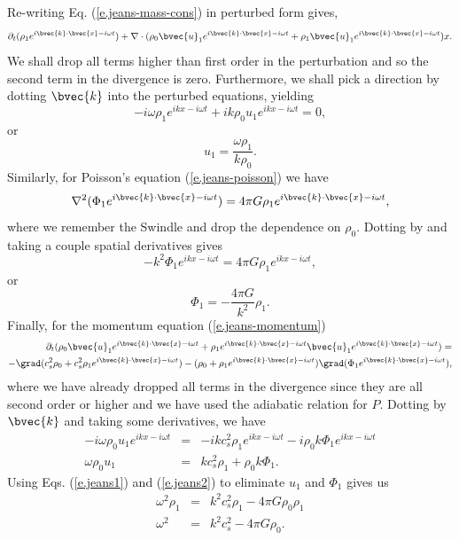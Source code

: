 Re-writing Eq. (\ref{e.jeans-mass-cons}) in perturbed form gives,
\newcommand{\expikx}{\ensuremath{e^{i\bvec{k}\cdot\bvec{x}-i\omega t}}}
\newcommand{\expikxb}{\ensuremath{e^{i{k}{x}-i\omega t}}}
\[ \partial_t (\rho_1 \expikx) + \nabla\cdot(\rho_0\bvec{u}_1\expikx + \rho_1\bvec{u}_1 \expikx)x.  \]
We shall drop all terms higher than first order in the perturbation and so the second term in the divergence is zero.
Furthermore, we shall pick a direction by dotting $\bvec{k}$ into the perturbed equations, yielding
\[
  -i\omega \rho_1 \expikxb + i k \rho_0 u_1 \expikxb = 0,
\]
or
\begin{equation}
  u_1 = \frac{\omega \rho_1}{k \rho_0}. \label{e.jeans1}
\end{equation}
Similarly, for Poisson's equation (\ref{e.jeans-poisson}) we have
\[ \nabla^2 (\Phi_1 \expikx) = 4\pi G \rho_1\expikx, \]
where we remember the Swindle and drop the dependence on $\rho_0$.
Dotting by  and taking a couple spatial derivatives gives
\[ -k^2 \Phi_1 \expikxb = 4\pi G \rho_1 \expikxb,  \]
or
\begin{equation}
  \Phi_1 = -\frac{4\pi G}{k^2} \rho_1. \label{e.jeans2}
\end{equation}
Finally, for the momentum equation (\ref{e.jeans-momentum})
\begin{eqnarray*}
  \partial_t (\rho_0 \bvec{u}_1\expikx + \rho_1\expikx\bvec{u}_1\expikx) = \\
  -\grad(c_s^2\rho_0 + c_s^2\rho_1\expikx) - (\rho_0+\rho_1\expikx)\grad(\Phi_1\expikx),
\end{eqnarray*}
where we have already dropped all terms in the divergence since they are all second order or higher and we have used the adiabatic relation for $P$.
Dotting by $\bvec{k}$ and taking some derivatives, we have
\begin{eqnarray*}
 -i\omega\rho_0 u_1 \expikxb &=& -i k c_s^2\rho_1\expikxb - i\rho_0 k \Phi_1\expikxb \\
 \omega\rho_0 u_1 &=& k c_s^2\rho_1 + \rho_0 k \Phi_1.
\end{eqnarray*}
Using Eqs. (\ref{e.jeans1}) and (\ref{e.jeans2}) to eliminate $u_1$ and $\Phi_1$ gives us
\begin{eqnarray}
  \omega^2\rho_1 &=& k^2 c_s^2\rho_1 - 4\pi G\rho_0 \rho_1 \nonumber\\
  \omega^2 &=& k^2 c_s^2 - 4\pi G\rho_0. \label{e.jeans-dispersion}
\end{eqnarray}

